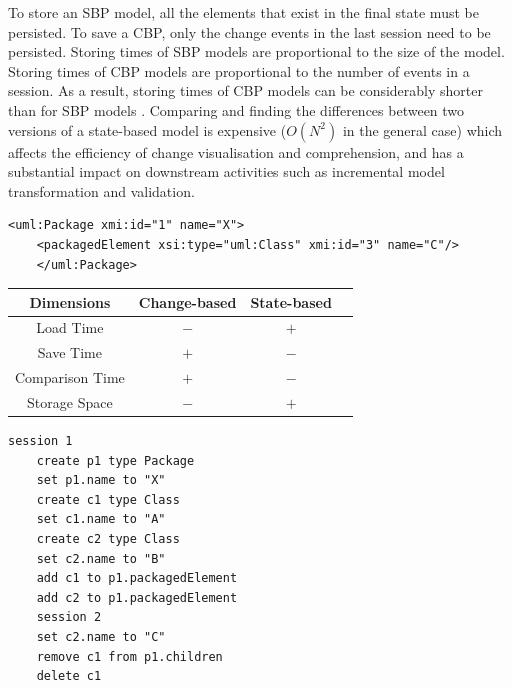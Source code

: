 \documentclass{llncs}
\begin{document}
To store an SBP model, all the elements that exist in the final state must be persisted. To save a CBP, only the change events in the last session need to be persisted. Storing times of SBP models are proportional to the size of the model. Storing times of CBP models are proportional to the number of events in a session. As a result, storing times of CBP models can be considerably shorter than for SBP models \cite{yohannis2018towards}. Comparing and finding the differences between two versions of a state-based model is expensive \cite{Kolovos:2009:DMM:1564596.1564641} ($O(N^2)$ in the general case) which affects the efficiency of change visualisation and comprehension, and has a substantial impact on downstream activities such as incremental model transformation \cite{DBLP:conf/ecmdafa/OgunyomiRK15} and validation.

\vspace{-15pt}
\begin{minipage}[t]{0.59\linewidth}
    \begin{lstlisting}[style=xmi,caption={The UML2 model of the example model in Fig. \ref{fig:illustration_cbp}.},label=lst:xmimodel2]
    <uml:Package xmi:id="1" name="X">
    <packagedElement xsi:type="uml:Class" xmi:id="3" name="C"/>
    </uml:Package>
    \end{lstlisting}
    
    \centering
    \label{table:persistence_comparsion}
    \begin{small}
        \begin{tabular}{ c c c c }
            \hline 
            \textbf{Dimensions} & \textbf{Change-based} & \textbf{State-based} \\
            \hline 
            Load Time & $-$ & $+$ \\
            Save Time & $+$ & $-$ \\
            Comparison Time & $+$ & $-$ \\
            Storage Space & $-$ & $+$ \\
            \hline 
        \end{tabular}
    \end{small}
\end{minipage}
\hfill
\begin{minipage}[t]{0.39\linewidth}
    \begin{lstlisting}[style=eol,caption={The textual CBP for producing state-based model in List. \ref{lst:xmimodel2}. Its visual illustration is in Fig. \ref{fig:illustration_cbp}.},label=lst:cbpmodel]
    session 1
    create p1 type Package
    set p1.name to "X" 
    create c1 type Class
    set c1.name to "A"
    create c2 type Class
    set c2.name to "B"
    add c1 to p1.packagedElement 
    add c2 to p1.packagedElement
    session 2
    set c2.name to "C"
    remove c1 from p1.children 
    delete c1
    \end{lstlisting}
\end{minipage}
\end{document}

